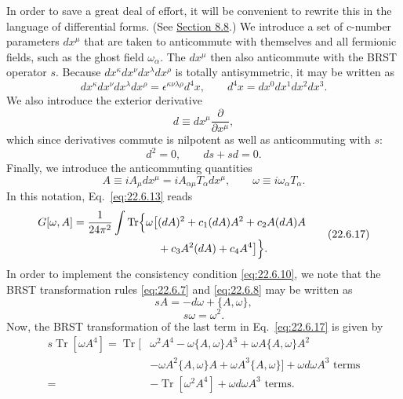 In order to save a great deal of effort, it will be convenient to rewrite
this in the language of differential forms. (See
\hyperref[sec:8.8]{Section 8.8}.) We introduce a set of c-number parameters
$dx^\mu$ that are taken to anticommute with themselves and all fermionic
fields, such as the ghost field $\omega_\alpha$. The $dx^\mu$ then also
anticommute with the BRST operator $s$. Because
$dx^\kappa dx^\nu dx^\lambda dx^\rho$ is totally antisymmetric, it may be
written as
\begin{equation}
 dx^\kappa dx^\nu dx^\lambda dx^\rho
 =\epsilon^{\kappa\nu\lambda\rho}d^4x,
 \qquad
 d^4x=dx^0dx^1dx^2dx^3.
 \tag{22.6.14}\label{eq:22.6.14}
\end{equation}
We also introduce the exterior derivative
\[
 d\equiv dx^\mu\frac{\partial}{\partial x^\mu},
\]
which since derivatives commute is nilpotent as well as anticommuting
with $s$:
\begin{equation}
 d^2=0,
 \qquad
 ds+sd=0.
 \tag{22.6.15}\label{eq:22.6.15}
\end{equation}
Finally, we introduce the anticommuting quantities
\begin{equation}
 A\equiv iA_\mu dx^\mu
 =iA_{\alpha\mu}T_\alpha dx^\mu,
 \qquad
 \omega\equiv i\omega_\alpha T_\alpha.
 \tag{22.6.16}\label{eq:22.6.16}
\end{equation}
In this notation, Eq.~\eqref{eq:22.6.13} reads
\begin{equation}
 \begin{aligned}
 G[\omega,A]
 =\frac{1}{24\pi^2}\int\operatorname{Tr}\Bigl\{
 \omega\bigl[
 &(dA)^2+c_1(dA)A^2+c_2A(dA)A
 \\
 &+c_3A^2(dA)+c_4A^4
 \bigr]\Bigr\}.
 \end{aligned}
 \tag{22.6.17}\label{eq:22.6.17}
\end{equation}
In order to implement the consistency condition \eqref{eq:22.6.10}, we
note that the BRST transformation rules \eqref{eq:22.6.7} and
\eqref{eq:22.6.8} may be written as
\begin{equation}
 sA=-d\omega+\{A,\omega\},
 \tag{22.6.18}\label{eq:22.6.18}
\end{equation}
\begin{equation}
 s\omega=\omega^2.
 \tag{22.6.19}\label{eq:22.6.19}
\end{equation}
Now, the BRST transformation of the last term in Eq.~\eqref{eq:22.6.17}
is given by
\[
 \begin{aligned}
 s\operatorname{Tr}[\omega A^4]
 =\operatorname{Tr}\bigl[
 &\omega^2A^4-\omega\{A,\omega\}A^3
 +\omega A\{A,\omega\}A^2
 \\
 &-\omega A^2\{A,\omega\}A
 +\omega A^3\{A,\omega\}
 \bigr]
 +\text{$\omega d\omega A^3$ terms}
 \\
 ={}&-\operatorname{Tr}[\omega^2A^4]
 +\text{$\omega d\omega A^3$ terms}.
 \end{aligned}
\]
